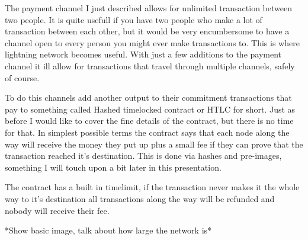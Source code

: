 The payment channel I just described allows for unlimited transaction between two people.
It is quite usefull if you have two people who make a lot of transaction between each other,
but it would be very encumbersome to have a channel open to every person you might ever
make transactions to. This is where lightning network becomes useful. With just a few
additions to the payment channel it ill allow for transactions that travel through
multiple channels, safely of course.

To do this channels add another output to their commitment transactions that pay
to something called Hashed timelocked contract or HTLC for short. Just as before
I would like to cover the fine details of the contract, but there is no time for 
that. In simplest possible terms the contract says that each node along the way will
receive the money they put up plus a small fee if they can prove that the transaction
reached it's destination. This is done via hashes and pre-images, something I will touch
upon a bit later in this presentation.

The contract has a built in timelimit, if the transaction never makes it the whole way
to it's destination all transactions along the way will be refunded and nobody will receive
their fee. 

*Show basic image, talk about how large the network is* 
